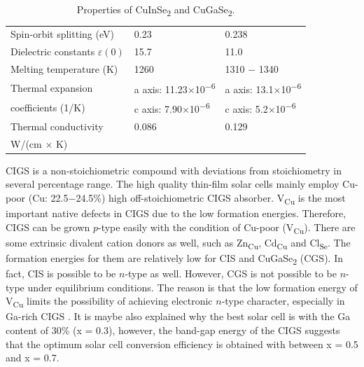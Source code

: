 \documentclass[a4paper, 12pt, titlepage,oneside,drop]{kthesis}
\begin{document}
\begin {table}[!htb]
\begin{tabular}{l l l}
\rowcolor[gray]{0.9}
Spin-orbit splitting (eV) & 0.23 \cite{madelung2004semiconductors}& 0.238 \cite{madelung2004semiconductors} \\ 
Dielectric constants $\varepsilon(0)$ & 15.7 \cite{madelung2004semiconductors} & 11.0 \cite{rau2006wide}\\
\rowcolor[gray]{0.9}
Melting temperature (K)& 1260 \cite{madelung2004semiconductors} & 1310 $-$ 1340 \cite{madelung2004semiconductors}\\
Thermal expansion & a axis: 11.23$\times$10\textsuperscript{$-$6} \cite{madelung2004semiconductors}& a axis: 13.1$\times$10\textsuperscript{$-$6} \cite{madelung2004semiconductors}\\
 coefficients (1/K) & c axis: 7.90$\times$10\textsuperscript{$-$6} \cite{madelung2004semiconductors}&c axis: 5.2$\times$10\textsuperscript{$-$6} \cite{madelung2004semiconductors}\\ 
\rowcolor[gray]{0.9}
Thermal conductivity& 0.086 \cite{neumann1986optical} & 0.129 \cite{madelung2004semiconductors} \\ 
 \rowcolor[gray]{0.9} W/(cm $\times$ K)&  & \\ 
\bottomrule
\end{tabular}
\caption {Properties of CuInSe\textsubscript{2} and CuGaSe\textsubscript{2}.}
\label{kth518}
\end{table}



CIGS is a non-stoichiometric compound with deviations from stoichiometry in several percentage range. The high quality thin-film solar cells mainly employ Cu-poor (Cu: 22.5$-$24.5\%) high off-stoichiometric CIGS absorber.
V\textsubscript{Cu} is the most important native defects in CIGS due to the low formation energies. Therefore, CIGS can be grown $p$-type easily with the condition of Cu-poor (V\textsubscript{Cu}).
There are some extrinsic divalent cation donors as well, such as Zn\textsubscript{Cu}, Cd\textsubscript{Cu} and Cl\textsubscript{Se}. The formation energies 
for them are relatively low for CIS and CuGaSe\textsubscript{2} (CGS). In fact, CIS is possible to be $n$-type as well. However, CGS is not possible to be $n$-type under equilibrium conditions. The reason is that the low formation energy of
V\textsubscript{Cu} limits the possibility of achieving electronic $n$-type character, especially in Ga-rich CIGS \cite{persson2005n, zhao2004can}. It is maybe also explained why the best solar cell is with the Ga content of 30\% (x = 0.3), however,
the band-gap energy of the CIGS suggests that the optimum solar cell conversion efficiency is obtained with between x = 0.5 and x = 0.7.
\end{document}
